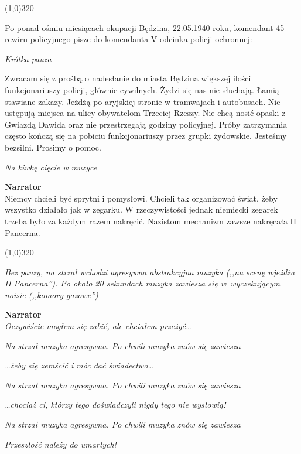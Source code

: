 \documentclass[11pt,a4paper,oneside]{article}
\begin{document}
\line(1,0){320}

Po ponad ośmiu miesiącach okupacji Będzina, 22.05.1940 roku, komendant
45 rewiru policyjnego pisze do komendanta V odcinka policji 
ochronnej:

{\color{light-gray} \emph{Krótka pauza}}

Zwracam się z prośbą o nadesłanie do miasta Będzina większej ilości
funkcjonariuszy policji, głównie cywilnych.   Żydzi się nas nie słuchają. Łamią stawiane zakazy. Jeżdżą
po aryjskiej stronie w tramwajach i autobusach. Nie ustępują miejsca
na ulicy obywatelom Trzeciej Rzeszy. Nie chcą nosić opaski z Gwiazdą
Dawida oraz nie przestrzegają godziny policyjnej. Próby zatrzymania
często kończą się na pobiciu funkcjonariuszy przez grupki żydowskie.
Jesteśmy bezsilni.  Prosimy o pomoc.

{\color{light-gray} \emph{Na kiwkę cięcie w muzyce}}


\textbf{Narrator}\\
Niemcy chcieli być sprytni i pomysłowi. Chcieli tak organizować świat,
żeby wszystko działało jak w zegarku. W rzeczywistości jednak
niemiecki zegarek trzeba było za każdym razem nakręcić. Nazistom
mechanizm zawsze nakręcała II Pancerna. 

\line(1,0){320}

{\color{light-gray} \emph{Bez pauzy, na strzał wchodzi agresywna
abstrakcyjna muzyka (,,na scenę wjeżdża II Pancerna''). Po około 20
sekundach muzyka zawiesza się w~wyczekującym noisie (,,komory
gazowe'')}}

\textbf{Narrator}\\
\emph{Oczywiście mogłem się zabić, ale chciałem przeżyć\dots{}} 

{\color{light-gray} \emph{Na strzał muzyka agresywna. Po chwili muzyka znów się zawiesza}}

\emph{\dots{}żeby się zemścić i móc dać świadectwo\dots{}}

{\color{light-gray} \emph{Na strzał muzyka agresywna. Po chwili muzyka znów się zawiesza}}

\emph{\dots{}chociaż ci, którzy tego doświadczyli nigdy tego nie wysłowią!}

{\color{light-gray} \emph{Na strzał muzyka agresywna. Po chwili muzyka znów się zawiesza}}

\emph{Przeszłość należy do umarłych!}
\end{document}
